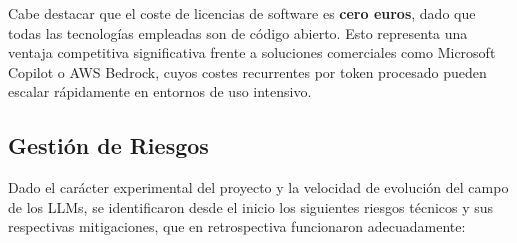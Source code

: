\begin{table}[H]
\centering
\caption{Estimación de presupuesto para el despliegue del sistema.}
\label{tab:presupuesto}
\end{table}

Cabe destacar que el coste de licencias de software es \textbf{cero euros}, dado que todas las tecnologías empleadas son de código abierto. Esto representa una ventaja competitiva significativa frente a soluciones comerciales como Microsoft Copilot o AWS Bedrock, cuyos costes recurrentes por token procesado pueden escalar rápidamente en entornos de uso intensivo.

\subsection{Gestión de Riesgos}

Dado el carácter experimental del proyecto y la velocidad de evolución del campo de los LLMs, se identificaron desde el inicio los siguientes riesgos técnicos y sus respectivas mitigaciones, que en retrospectiva funcionaron adecuadamente:

